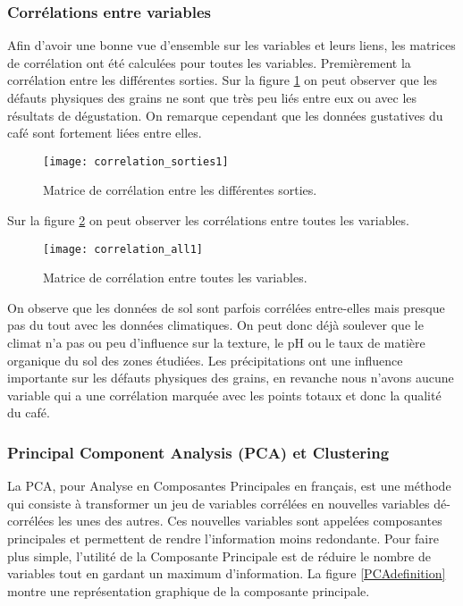 \subsubsection{Corrélations entre variables}

Afin d'avoir une bonne vue d'ensemble sur les variables et leurs liens, les matrices de corrélation ont été calculées pour toutes les variables. Premièrement la corrélation entre les différentes sorties. Sur la figure \ref{correlation_sorties1} on peut observer que les défauts physiques des grains ne sont que très peu liés entre eux ou avec les résultats de dégustation. On remarque cependant que les données gustatives du café sont fortement liées entre elles. 

\begin{figure}[H]
	\texttt{[image: correlation\_sorties1]}
	\caption{\label{correlation_sorties1} Matrice de corrélation entre les différentes sorties.}
\end{figure}


\noindent Sur la figure \ref{correlation_all1} on peut observer les corrélations entre toutes les variables. 


\begin{figure}[H]
	\texttt{[image: correlation\_all1]}
	\caption{\label{correlation_all1} Matrice de corrélation entre toutes les variables.}
\end{figure}


\noindent On observe que les données de sol sont parfois corrélées entre-elles mais presque pas du tout avec les données climatiques. On peut donc déjà soulever que le climat n'a pas ou peu d'influence sur la texture, le pH ou le taux de matière organique du sol des zones étudiées. Les précipitations ont une influence importante sur les défauts physiques des grains, en revanche nous n'avons aucune variable qui a une corrélation marquée avec les points totaux et donc la qualité du café.   












\newpage
\subsubsection{Principal Component Analysis (PCA) et Clustering}\label{PCAss}
La PCA, pour Analyse en Composantes Principales en français, est une méthode qui consiste à transformer un jeu de variables corrélées en nouvelles variables dé-corrélées les unes des autres. Ces nouvelles variables sont appelées composantes principales et permettent de rendre l'information moins redondante. Pour faire plus simple, l'utilité de la Composante Principale est de réduire le nombre de variables tout en gardant un maximum d'information. La figure \ref{PCAdefinition} montre une représentation graphique de la composante principale. 


